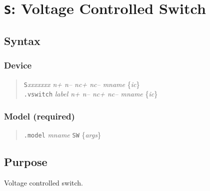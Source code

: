 %
%
%
%
\section{{\tt S}: Voltage Controlled Switch}
\subsection{Syntax}
\subsubsection{Device}
\begin{verse}
{\tt S}{\it xxxxxxx n+ n-- nc+ nc-- mname} \{{\it ic}\}\\
{\tt .vswitch} {\it label n+ n-- nc+ nc-- mname} \{{\it ic}\}
\end{verse}
\subsubsection{Model (required)}
\begin{verse}
{\tt .model} {\it mname} {\tt SW} \{{\it args}\}
\end{verse}
\subsection{Purpose}

Voltage controlled switch.
